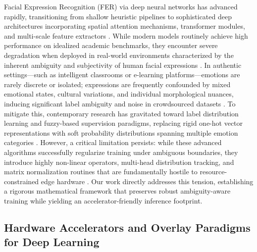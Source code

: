\documentclass[algorithms,article,submit,moreauthors]{Definitions/mdpi}
\begin{document}
Facial Expression Recognition (FER) via deep neural networks \citep{bibfer} has advanced rapidly, transitioning from shallow heuristic pipelines to sophisticated deep architectures incorporating spatial attention mechanisms, transformer modules, and multi-scale feature extractors \citep{li2020deep}. While modern models routinely achieve high performance on idealized academic benchmarks, they encounter severe degradation when deployed in real-world environments characterized by the inherent ambiguity and subjectivity of human facial expressions \citep{bibfacs}. In authentic settings—such as intelligent classrooms or e-learning platforms—emotions are rarely discrete or isolated; expressions are frequently confounded by mixed emotional states, cultural variations, and individual morphological nuances, inducing significant label ambiguity and noise in crowdsourced datasets \citep{zeng2018facial}. To mitigate this, contemporary research has gravitated toward label distribution learning and fuzzy-based supervision paradigms, replacing rigid one-hot vector representations with soft probability distributions spanning multiple emotion categories \citep{geng2016label,chen2020ldl}. However, a critical limitation persists: while these advanced algorithms successfully regularize training under ambiguous boundaries, they introduce highly non-linear operators, multi-head distribution tracking, and matrix normalization routines that are fundamentally hostile to resource-constrained edge hardware \citep{bib15}. Our work directly addresses this tension, establishing a rigorous mathematical framework that preserves robust ambiguity-aware training while yielding an accelerator-friendly inference footprint.

\subsection{Hardware Accelerators and Overlay Paradigms for Deep Learning}
\end{document}
